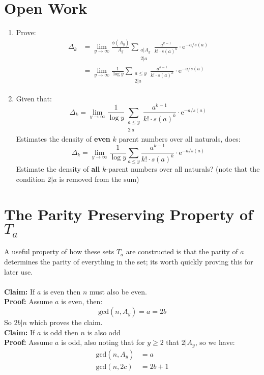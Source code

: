 \documentclass[12pt]{amsart}
\theoremstyle{definition}
\numberwithin{equation}{section}
\begin{document}
\section{Open Work}
\begin{enumerate}
    \item Prove: \begin{align*}
       \Delta_k &= \lim_{y \to \infty} \frac{\phi(A_y)}{A_y} \sum_{\substack{a | A_y \\ 2 | a}} \frac{a^{k-1}}{k! \cdot s(a)^k} \cdot \text{e}^{-a/s(a)}\\
       &= \lim_{y \to \infty} \frac{1}{\log y}\sum_{\substack{a\leq y \\ 2 | a}} \frac{a^{k-1}}{k! \cdot s(a)^k} \cdot \text{e}^{-a/s(a)}
   \end{align*}
   
   \item Given that: $$\Delta_k = \lim_{y \to \infty} \frac{1}{\log y}\sum_{\substack{a\leq y \\ 2 | a}} \frac{a^{k-1}}{k! \cdot s(a)^k} \cdot \text{e}^{-a/s(a)}$$ 
   Estimates the density of \textbf{even} $k$ parent numbers over all naturals, does:$$\Delta_k = \lim_{y \to \infty} \frac{1}{\log y}\sum_{a\leq y} \frac{a^{k-1}}{k! \cdot s(a)^k} \cdot \text{e}^{-a/s(a)}$$ Estimate the density of \textbf{all} $k$-parent numbers over all naturals? (note that the condition $2|a$ is removed from the sum)
\end{enumerate}

\section{The Parity Preserving Property of $T_a$}
A useful property of how these sets $T_a$ are constructed is that the parity of $a$ determines the parity of everything in the set; its worth quickly proving this for later use.\\\\
    \textbf{Claim:} If $a$ is even then $n$ must also be even.\\
   \textbf{Proof:} Assume $a$ is even, then: 
    $$\text{gcd}(n, A_y) = a = 2b$$
    So  $2b|n$ which proves the claim.\\
    
    \textbf{Claim:} If $a$ is odd then $n$ is also odd\\
    \textbf{Proof:} Assume $a$ is odd, also noting that for $y \geq 2$ that $2|A_y$, so we have: 
    \begin{align*}
        \text{gcd}(n, A_y) &= a\\
        \text{gcd}(n, 2c) &= 2b+1
    \end{align*}
\end{document}
